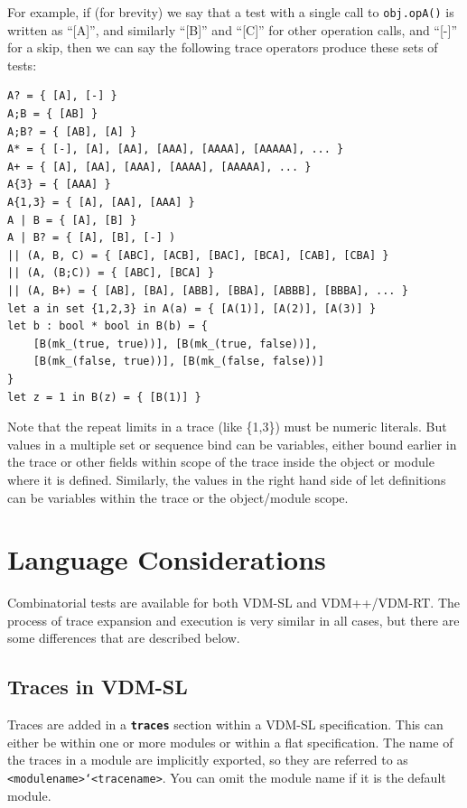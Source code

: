 \documentclass{overturerepchap}
\begin{document}
\noindent For example, if (for brevity) we say that a test with a single call to
\texttt{obj.opA()} is written as ``[A]'', and similarly ``[B]'' and ``[C]'' 
for other operation calls, and ``[-]'' for a skip, then we can say the 
following trace operators produce these sets of tests:

\small
\lstset{style=tool,language=}
\begin{lstlisting}[escapechar=@]
A? = { [A], [-] }
A;B = { [AB] }
A;B? = { [AB], [A] }
A* = { [-], [A], [AA], [AAA], [AAAA], [AAAAA], ... }
A+ = { [A], [AA], [AAA], [AAAA], [AAAAA], ... }
A{3} = { [AAA] }
A{1,3} = { [A], [AA], [AAA] }
A | B = { [A], [B] }
A | B? = { [A], [B], [-] )
|| (A, B, C) = { [ABC], [ACB], [BAC], [BCA], [CAB], [CBA] }
|| (A, (B;C)) = { [ABC], [BCA] }
|| (A, B+) = { [AB], [BA], [ABB], [BBA], [ABBB], [BBBA], ... }
let a in set {1,2,3} in A(a) = { [A(1)], [A(2)], [A(3)] }
let b : bool * bool in B(b) = {
    [B(mk_(true, true))], [B(mk_(true, false))],
    [B(mk_(false, true))], [B(mk_(false, false))]
}
let z = 1 in B(z) = { [B(1)] }
\end{lstlisting}
\lstset{style=mystyle}
\lstset{language=VDM++}
\normalsize

\noindent Note that the repeat limits in a trace (like \{1,3\}) must be numeric literals.
But values in a multiple set or sequence bind can be variables, either bound
earlier in the trace or other fields within scope of the trace inside the object
or module where it is defined. Similarly, the values in the right hand side of
let definitions can be variables within the trace or the object/module scope.

\section{Language Considerations}

Combinatorial tests are available for both VDM-SL and VDM++/VDM-RT. The process 
of trace expansion and execution is very similar in all cases, but there are
some differences that are described below.

\subsection{Traces in VDM-SL}

Traces are added in a \texttt{\textbf{traces}} section within a VDM-SL
specification.
This can either be within one or more modules or within a flat specification. The name of
the traces in a module are implicitly exported, so they are referred to as
\texttt{<modulename>`<tracename>}. You can omit the module name if it is the
default module.
\end{document}
